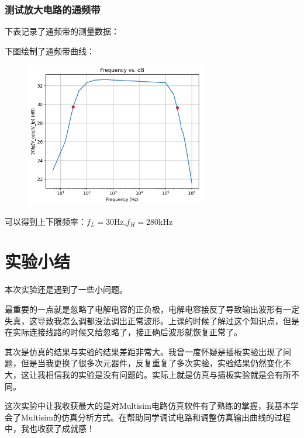 \documentclass[a4paper,11pt,UTF8]{article}
\numberwithin{equation}{subsection}
\begin{document}
\subsubsection{测试放大电路的通频带}
下表记录了通频带的测量数据：
\begin{table}[H]
	\centering
	\caption{通频带($V_{\mathrm{ipp}}=30$mV)}
\end{table}
下图绘制了通频带曲线：
\begin{figure}[H]
	\centering
	\includegraphics[width=0.7\textwidth]{6.2.5}
\end{figure}
可以得到上下限频率：$f_L=30$Hz,$f_H=280$kHz
\section{实验小结}
本次实验还是遇到了一些小问题。

最重要的一点就是忽略了电解电容的正负极，电解电容接反了导致输出波形有一定失真，这导致我怎么调都没法调出正常波形。上课的时候了解过这个知识点，但是在实际连接线路的时候又给忽略了，接正确后波形就恢复正常了。

其次是仿真的结果与实验的结果差距非常大。我曾一度怀疑是插板实验出现了问题，但是当我更换了很多次元器件，反复重复了多次实验，实验结果仍然变化不大，这让我相信我的实验是没有问题的。实际上就是仿真与插板实验就是会有所不同。

这次实验中让我收获最大的是对Multisim电路仿真软件有了熟练的掌握，我基本学会了Multisim的仿真分析方式。在帮助同学调试电路和调整仿真输出曲线的过程中，我也收获了成就感！
\end{document}
